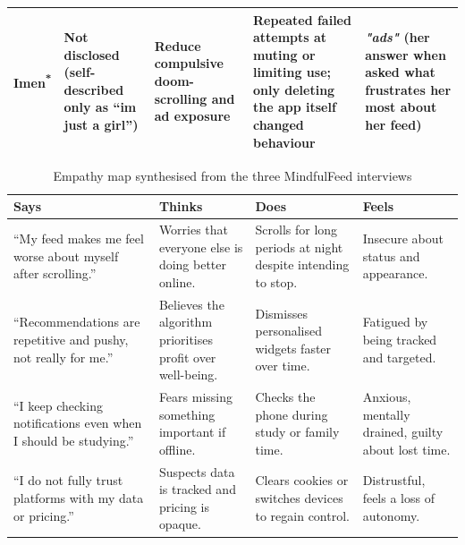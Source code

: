 \documentclass[11pt]{article}
\begin{document}
\begin{table}[H]
\begin{tabular}{p{1.8cm}p{2.6cm}p{3.2cm}p{3.2cm}p{5.5cm}}
Imen\textsuperscript{*} & Not disclosed (self-described only as ``im just a girl'') & Reduce compulsive doom-scrolling and ad exposure & Repeated failed attempts at muting or limiting use; only deleting the app itself changed behaviour & \textit{"ads"} (her answer when asked what frustrates her most about her feed) \\
\hline
\end{tabular}
\end{table}

\begin{table}[H]
\centering
\caption{Empathy map synthesised from the three MindfulFeed interviews}
\label{tab:empathy_map_mindfulfeed}
\small
\begin{tabular}{p{4cm} p{4cm} p{4cm} p{4cm}}
\hline
\textbf{Says} & \textbf{Thinks} & \textbf{Does} & \textbf{Feels} \\
\hline
``My feed makes me feel worse about myself after scrolling.'' & Worries that everyone else is doing better online. & Scrolls for long periods at night despite intending to stop. & Insecure about status and appearance. \\
``Recommendations are repetitive and pushy, not really for me.'' & Believes the algorithm prioritises profit over well-being. & Dismisses personalised widgets faster over time. & Fatigued by being tracked and targeted. \\
``I keep checking notifications even when I should be studying.'' & Fears missing something important if offline. & Checks the phone during study or family time. & Anxious, mentally drained, guilty about lost time. \\
``I do not fully trust platforms with my data or pricing.'' & Suspects data is tracked and pricing is opaque. & Clears cookies or switches devices to regain control. & Distrustful, feels a loss of autonomy. \\
\hline
\end{tabular}
\end{table}
\end{document}
